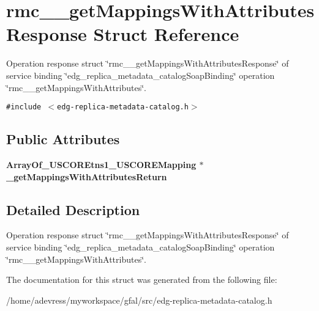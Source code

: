 \section{rmc\_\-\_\-get\-Mappings\-With\-Attributes\-Response Struct Reference}
\label{structrmc____getMappingsWithAttributesResponse}
Operation response struct \char`\"{}rmc\_\-\_\-get\-Mappings\-With\-Attributes\-Response\char`\"{} of service binding \char`\"{}edg\_\-replica\_\-metadata\_\-catalog\-Soap\-Binding\char`\"{} operation \char`\"{}rmc\_\-\_\-get\-Mappings\-With\-Attributes\char`\"{}.  


{\tt \#include $<$edg-replica-metadata-catalog.h$>$}

\subsection*{Public Attributes}
\begin{CompactItemize}
\item 
\bf{Array\-Of\_\-USCOREtns1\_\-USCOREMapping} $\ast$ \textbf{\_\-get\-Mappings\-With\-Attributes\-Return}\label{structrmc____getMappingsWithAttributesResponse_3a1b1de101f8e40222b084729419ab74}

\end{CompactItemize}


\subsection{Detailed Description}
Operation response struct \char`\"{}rmc\_\-\_\-get\-Mappings\-With\-Attributes\-Response\char`\"{} of service binding \char`\"{}edg\_\-replica\_\-metadata\_\-catalog\-Soap\-Binding\char`\"{} operation \char`\"{}rmc\_\-\_\-get\-Mappings\-With\-Attributes\char`\"{}. 



The documentation for this struct was generated from the following file:\begin{CompactItemize}
\item 
/home/adevress/myworkspace/gfal/src/edg-replica-metadata-catalog.h\end{CompactItemize}
